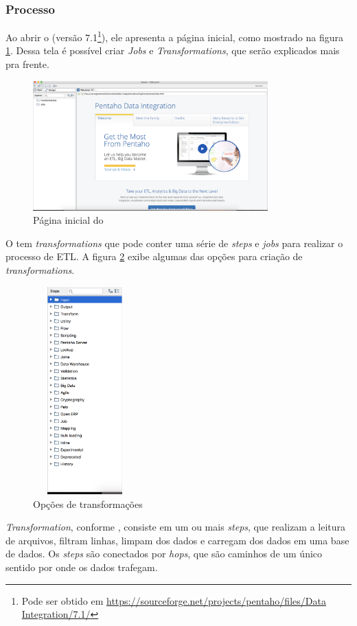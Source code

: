 \subsubsection{Processo}
Ao abrir o \pdi (versão 7.1\footnote{Pode ser obtido em \url{https://sourceforge.net/projects/pentaho/files/Data Integration/7.1/}}), ele apresenta a página inicial, como mostrado na figura \ref{initialpdi}. Dessa tela é possível criar \textit{Jobs} e \textit{Transformations}, que serão explicados mais pra frente. 
\begin{figure}[H]
\centering
\includegraphics[height=5cm]{imagens/pagina_principal_pentaho.png}
\caption{Página inicial do \pdi}
\label{initialpdi}
\end{figure}
O \pdi tem \textit{transformations} que pode conter uma série de \textit{steps} e \textit{jobs} para realizar o processo de ETL. A figura \ref{transformationOptions} exibe algumas das opções para criação de \textit{transformations}.
\begin{figure}[H]
\centering
\includegraphics[width=4cm, height=8cm]{imagens/opcoes_de_transformacao.png}
\caption{Opções de transformações}
\label{transformationOptions}

\end{figure}
\textit{Transformation}, conforme , consiste em um ou mais \textit{steps}, que realizam a leitura de arquivos, filtram linhas, limpam dos dados e carregam dos dados em uma base de dados. Os \textit{steps} são conectados por \textit{hops}, que são caminhos de um único sentido por onde os dados trafegam. 

